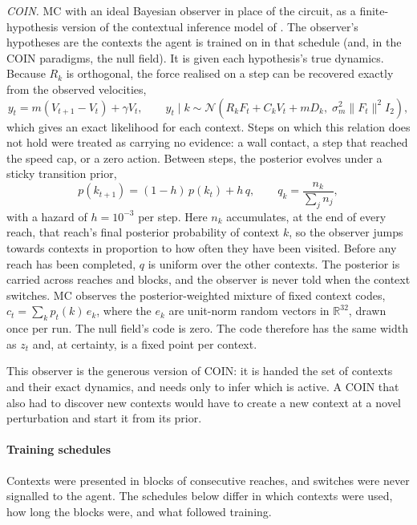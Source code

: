 \textit{COIN.} MC with an ideal Bayesian observer in place of the circuit, as a finite-hypothesis version of the contextual inference model of \citet{heald2021contextual}. The observer's hypotheses are the contexts the agent is trained on in that schedule (and, in the COIN paradigms, the null field). It is given each hypothesis's true dynamics. Because $R_k$ is orthogonal, the force realised on a step can be recovered exactly from the observed velocities,
\begin{equation}
    y_t = m \left( V_{t+1} - V_t \right) + \gamma V_t ,
    \qquad
    y_t \mid k \sim \mathcal{N}\!\left( R_k F_t + C_k V_t + m D_k, \; \sigma_m^2 \lVert F_t \rVert^2 I_2 \right),
\end{equation}
which gives an exact likelihood for each context. Steps on which this relation does not hold were treated as carrying no evidence: a wall contact, a step that reached the speed cap, or a zero action. Between steps, the posterior evolves under a sticky transition prior,
\begin{equation}
    p(k_{t+1}) = (1 - h)\, p(k_t) + h \, q, \qquad
    q_k = \frac{n_k}{\sum_j n_j},
\end{equation}
with a hazard of $h = 10^{-3}$ per step. Here $n_k$ accumulates, at the end of every reach, that reach's final posterior probability of context $k$, so the observer jumps towards contexts in proportion to how often they have been visited. Before any reach has been completed, $q$ is uniform over the other contexts. The posterior is carried across reaches and blocks, and the observer is never told when the context switches. MC observes the posterior-weighted mixture of fixed context codes, $c_t = \sum_k p_t(k)\, e_k$, where the $e_k$ are unit-norm random vectors in $\mathbb{R}^{32}$, drawn once per run. The null field's code is zero. The code therefore has the same width as $z_t$ and, at certainty, is a fixed point per context.

This observer is the generous version of COIN: it is handed the set of contexts and their exact dynamics, and needs only to infer which is active. A COIN that also had to discover new contexts would have to create a new context at a novel perturbation and start it from its prior.

\paragraph{Training schedules}
Contexts were presented in blocks of consecutive reaches, and switches were never signalled to the agent. The schedules below differ in which contexts were used, how long the blocks were, and what followed training.

